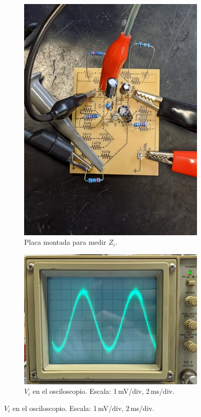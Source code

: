 \begin{frame}{}
\begin{figure}
  \centering
  \begin{subfigure}[t]{0.65\linewidth}
    \centering
    \includegraphics[height=0.65\textheight]{pictures/Placa_Zi.jpeg}
    \caption{Placa montada para medir $Z_i$.}
  \end{subfigure}\hfill
  \begin{subfigure}[t]{0.35\linewidth}
    \centering
    \includegraphics[height=0.35\textheight]{pictures/Medicion Vi.jpeg}
    \caption{$V_i$ en el osciloscopio. Escala: 1\,mV/div, 2\,ms/div.}
  \end{subfigure}
\end{figure}
\end{frame}


